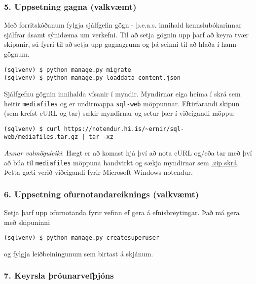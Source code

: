 \subsubsection{5. Uppsetning gagna
(valkvæmt)}\label{uppsetning-gagna-valkvuxe6mt}

Með forritskóðanum fylgja sjálfgefin gögn - þ.e.a.s. innihald
kennslubókarinnar sjálfrar ásamt sýnidæma um verkefni. Til að setja
gögnin upp þarf að keyra tvær skipanir, sú fyrri til að setja upp
gagnagrunn og þá seinni til að hlaða í hann gögnum.

\begin{verbatim}
(sqlvenv) $ python manage.py migrate
(sqlvenv) $ python manage.py loaddata content.json
\end{verbatim}

Sjálfgefnu gögnin innihalda vísanir í myndir. Myndirnar eiga heima í
skrá sem heitir \texttt{mediafiles} og er undirmappa \texttt{sql-web}
möppunnar. Eftirfarandi skipun (sem krefst cURL og tar) sækir myndirnar
og setur þær í viðeigandi möppu:

\begin{verbatim}
(sqlvenv) $ curl https://notendur.hi.is/~ernir/sql-web/mediafiles.tar.gz | tar -xz
\end{verbatim}

\emph{Annar valmöguleiki}: Hægt er að komast hjá því að nota cURL og/eða
tar með því að búa til \texttt{mediafiles} möppuna handvirkt og sækja
myndirnar sem
\href{https://notendur.hi.is/~ernir/sql-web/mediafiles.zip}{.zip skrá}.
Þetta gæti verið viðeigandi fyrir Microsoft Windows notendur.

\subsubsection{6. Uppsetning ofurnotandareiknings
(valkvæmt)}\label{uppsetning-ofurnotandareiknings-valkvuxe6mt}

Setja þarf upp ofurnotanda fyrir vefinn ef gera á efnisbreytingar. Það
má gera með skipuninni

\begin{verbatim}
(sqlvenv) $ python manage.py createsuperuser
\end{verbatim}

og fylgja leiðbeiningunum sem birtast á skjánum.

\subsubsection{7. Keyrsla
þróunarvefþjóns}\label{keyrsla-uxferuxf3unarvefuxfejuxf3ns}

